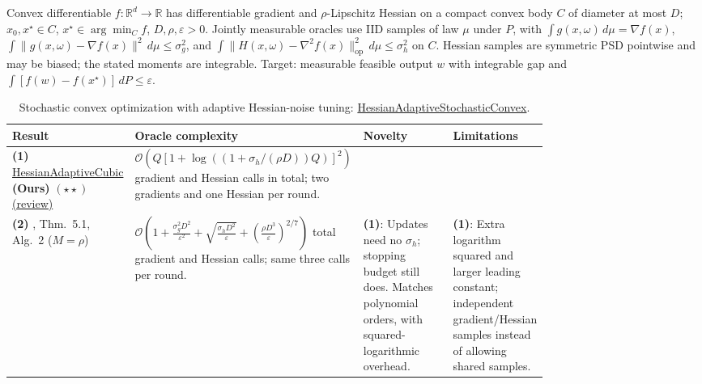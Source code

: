 \begin{table}[tp]
\centering
\caption{Stochastic convex optimization with adaptive Hessian-noise tuning: \href{https://github.com/k3nfalt/longtails/blob/main/LongTails/Setups/HessianAdaptiveStochasticConvex.lean}{HessianAdaptiveStochasticConvex}.}\label{tab:HessianAdaptiveStochasticConvex}
\parbox{\linewidth}{\footnotesize Convex differentiable $f:\mathbb{R}^d\to\mathbb{R}$ has differentiable gradient and $\rho$-Lipschitz Hessian on a compact convex body $C$ of diameter at most $D$; $x_0,x^\star\in C$, $x^\star\in\arg\min_C f$, $D,\rho,\varepsilon>0$. Jointly measurable oracles use IID samples of law $\mu$ under $P$, with $\int g(x,\omega)\,d\mu=\nabla f(x)$, $\int\|g(x,\omega)-\nabla f(x)\|^2\,d\mu\le\sigma_g^2$, and $\int\|H(x,\omega)-\nabla^2 f(x)\|_{\mathrm{op}}^2\,d\mu\le\sigma_h^2$ on $C$. Hessian samples are symmetric PSD pointwise and may be biased; the stated moments are integrable. Target: measurable feasible output $w$ with integrable gap and $\int[f(w)-f(x^\star)]\,dP\le\varepsilon$.}\par\smallskip
\begin{threeparttable}
\footnotesize
\setlength{\tabcolsep}{4pt}\renewcommand{\arraystretch}{1.25}
\begin{tabularx}{\linewidth}{@{}>{\raggedright\arraybackslash}p{0.20\linewidth}>{\raggedright\arraybackslash}p{0.32\linewidth}>{\raggedright\arraybackslash}p{0.25\linewidth}>{\raggedright\arraybackslash}X@{}}
\toprule
\textbf{Result} & \textbf{Oracle complexity} & \textbf{Novelty} & \textbf{Limitations} \\
\midrule
\textbf{(1)} \href{https://github.com/k3nfalt/longtails/blob/main/LongTails/Theorems/HessianAdaptiveCubic.lean}{Hessian\allowbreak Adaptive\allowbreak Cubic} \textbf{(Ours)} $(\star\star)$ \href{https://github.com/k3nfalt/longtails/blob/main/scripts/reviews/HessianAdaptiveCubic.md}{(review)}
& $\mathcal{O}\!\left(Q[1+\log((1+\sigma_h/(\rho D))Q)]^2\right)$ gradient and Hessian calls in total; two gradients and one Hessian per round.
& & \\
\midrule[1.2pt]
\textbf{(2)} \citep{hascAgafonov2026Stochastic}, Thm.~5.1, Alg.~2 ($M=\rho$)
& $\mathcal{O}\!\left(1+\frac{\sigma_g^2D^2}{\varepsilon^2}+\sqrt{\frac{\sigma_hD^2}{\varepsilon}}+\left(\frac{\rho D^3}{\varepsilon}\right)^{2/7}\right)$ total gradient and Hessian calls; same three calls per round.
& \textbf{(1)}: Updates need no $\sigma_h$; stopping budget still does. Matches polynomial orders, with squared-logarithmic overhead.
& \textbf{(1)}: Extra logarithm squared and larger leading constant; independent gradient/Hessian samples instead of allowing shared samples. \\

\end{tabularx}
\end{threeparttable}
\end{table}
